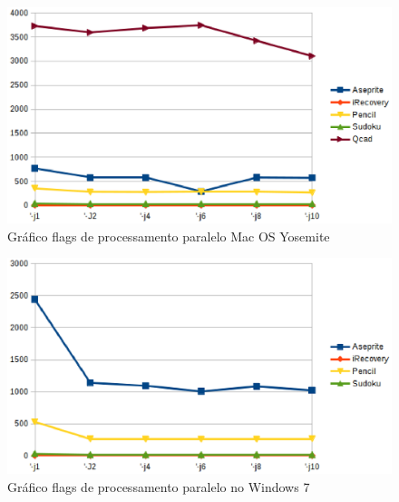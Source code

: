         \begin{figure}[!h]
            \centering
                \includegraphics{figuras/graficos/mac_os_processamento_paralelo.eps}
            \caption{Gráfico flags de processamento paralelo Mac OS Yosemite}
            \label{flags_de_processamento_paralelo_mac_os}
        \end{figure}

        \begin{figure}[!h]
            \centering
                \includegraphics{figuras/graficos/windows_processamento_paralelo.eps}
            \caption{Gráfico flags de processamento paralelo no Windows 7}
            \label{flags_de_processamento_paralelo_windows}
        \end{figure}

